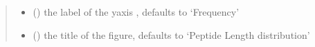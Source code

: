 \documentclass[letterpaper,10pt,english]{sphinxmanual}
\begin{document}
\begin{fulllineitems}
\begin{quote}
\begin{description}
\begin{itemize}
\item {} 
 (\sphinxstyleliteralemphasis{\sphinxupquote{, }}) \textendash{} the label of the y\sphinxhyphen{}axis , defaults to ‘Frequency’

\item {} 
 (\sphinxstyleliteralemphasis{\sphinxupquote{, }}) \textendash{} the title of the figure, defaults to ‘Peptide Length distribution’

\end{itemize}

\end{description}\end{quote}

\end{fulllineitems}

\end{document}
